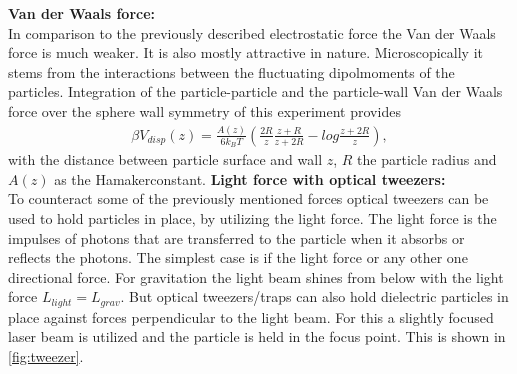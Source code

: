 \documentclass[.../bericht]{subfilies}
\begin{document}
        \textbf{Van der Waals force:}\\
        In comparison to the previously described electrostatic force the Van der Waals force is much weaker. It is also mostly attractive in nature. Microscopically it stems from the interactions between the fluctuating dipolmoments of the particles. Integration of the particle-particle and the particle-wall Van der Waals force over the sphere wall symmetry of this experiment provides
        \begin{align}
          \beta V_{disp}(z)=\frac{A(z)}{6k_B T}(\frac{2R}{z}\frac{z+R}{z+2R}-log\frac{z+2R}{z}),
        \end{align}
        with the distance between particle surface and wall $z$, $R$ the particle radius and $A(z)$ as the Hamakerconstant.
        \textbf{Light force with optical tweezers:}\\
        To counteract some of the previously mentioned forces optical tweezers can be used to hold particles in place, by utilizing the light force. The light force is the impulses of photons that are transferred to the particle when it absorbs or reflects the photons.
        The simplest case is if the light force or any other one directional force. For gravitation the light beam shines from below with the light force $L_{light}=L_{grav}$. But optical tweezers/traps can also hold dielectric particles in place against forces perpendicular to the light beam. For this a slightly focused laser beam is utilized and the particle is held in the focus point. This is shown in \ref{fig:tweezer}.
\end{document}
